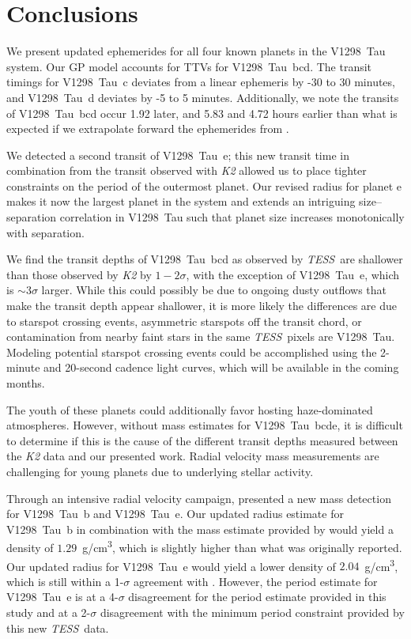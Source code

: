 \documentclass[twocolumn]{aastex631}
\newcommand{\tess}{\textit{TESS}}
\newcommand{\sname}{V1298~Tau\xspace}
\newcommand{\allplanets}{V1298~Tau~bcde\xspace}
\newcommand{\planetb}{V1298~Tau~b\xspace}
\newcommand{\planetc}{V1298~Tau~c\xspace}
\newcommand{\planetd}{V1298~Tau~d\xspace}
\newcommand{\planete}{V1298~Tau~e\xspace}
\newcommand{\planetknown}{V1298~Tau~bcd\xspace}
\begin{document}
\section{Conclusions} \label{sec:conclusions}

We present updated ephemerides for all four known planets in the \sname system. Our GP model accounts for TTVs for \planetknown. The transit timings for \planetc deviates from a linear ephemeris by -30 to 30 minutes, and \planetd deviates by -5 to 5 minutes. Additionally, we note the transits of \planetknown occur 1.92 later, and 5.83 and 4.72 hours earlier than what is expected if we extrapolate forward the ephemerides from \cite{David2019b}.

We detected a second transit of \planete; this new transit time in combination from the transit observed with \textit{K2} allowed us to place tighter constraints on the period of the outermost planet. Our revised radius for planet e makes it now the largest planet in the system and extends an intriguing size--separation correlation in \sname such that planet size increases monotonically with separation.

We find the transit depths of \planetknown as observed by \tess\ are shallower than those observed by \textit{K2} by $1-2\sigma$, with the exception of \planete, which is $\sim 3\sigma$ larger. While this could possibly be due to ongoing dusty outflows that make the transit depth appear shallower, it is more likely the differences are due to starspot crossing events, asymmetric starspots off the transit chord, or contamination from nearby faint stars in the same \tess\ pixels are \sname. Modeling potential starspot crossing events could be accomplished using the 2-minute and 20-second cadence light curves, which will be available in the coming months.

The youth of these planets could additionally favor hosting haze-dominated atmospheres. However, without mass estimates for \allplanets, it is difficult to determine if this is the cause of the different transit depths measured between the \textit{K2} data and our presented work. Radial velocity mass measurements are challenging for young planets due to underlying stellar activity.

Through an intensive radial velocity campaign, \cite{suarez21} presented a new mass detection for \planetb and \planete. Our updated radius estimate for \planetb in combination with the mass estimate provided by \cite{suarez21} would yield a density of $1.29$~g/cm\textsuperscript{3}, which is slightly higher than what was originally reported. Our updated radius for \planete would yield a lower density of $2.04$~g/cm\textsuperscript{3}, which is still within a 1-$\sigma$ agreement with \cite{suarez21}. However, the period estimate for \planete is at a 4-$\sigma$ disagreement for the period estimate provided in this study and at a 2-$\sigma$ disagreement with the minimum period constraint provided by this new \tess\ data.
\end{document}
